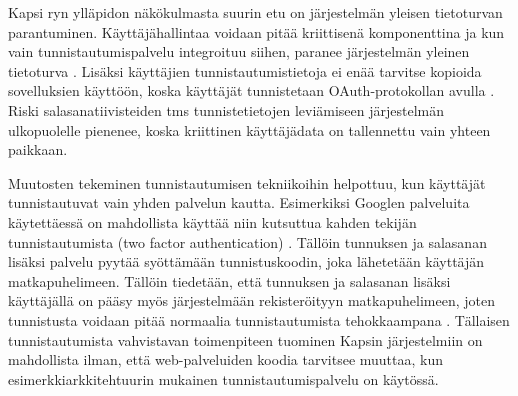 Kapsi ryn ylläpidon näkökulmasta suurin etu on järjestelmän yleisen tietoturvan parantuminen. Käyttäjähallintaa voidaan pitää kriittisenä komponenttina ja kun vain tunnistautumispalvelu integroituu siihen, paranee järjestelmän yleinen tietoturva \cite{arkkitehtuurit}. Lisäksi käyttäjien tunnistautumistietoja ei enää tarvitse kopioida sovelluksien käyttöön, koska käyttäjät tunnistetaan OAuth-protokollan avulla \cite{oauth2_0}. Riski salasanatiivisteiden tms tunnistetietojen leviämiseen järjestelmän ulkopuolelle pienenee, koska kriittinen käyttäjädata on tallennettu vain yhteen paikkaan.

Muutosten tekeminen tunnistautumisen tekniikoihin helpottuu, kun käyttäjät tunnistautuvat vain yhden palvelun kautta. Esimerkiksi Googlen palveluita käytettäessä on mahdollista käyttää niin kutsuttua kahden tekijän tunnistautumista (two factor authentication) \cite{google_two_factor}. Tällöin tunnuksen ja salasanan lisäksi palvelu pyytää syöttämään tunnistuskoodin, joka lähetetään käyttäjän matkapuhelimeen. Tällöin tiedetään, että tunnuksen ja salasanan lisäksi käyttäjällä on pääsy myös järjestelmään rekisteröityyn matkapuhelimeen, joten tunnistusta voidaan pitää normaalia tunnistautumista tehokkaampana \cite{}. Tällaisen tunnistautumista vahvistavan toimenpiteen tuominen Kapsin järjestelmiin on mahdollista ilman, että web-palveluiden koodia tarvitsee muuttaa, kun esimerkkiarkkitehtuurin mukainen tunnistautumispalvelu on käytössä.